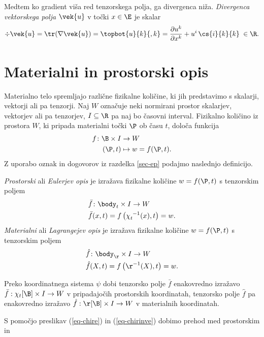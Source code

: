 Medtem ko gradient viša red tenzorskega polja, ga divergenca niža.
\emph{Divergenca vektorskega polja} $\vek{u}$ v točki $x\in\E$ je skalar
\begin{equation*}
	\div \vek{u}=\tr(\nabla\vek{u})=\topbot{u}{k}{,k}=\frac{\partial u^k}{\partial x^k}+u^i\,\cs{i}{k}{k}\;\in\R.
\end{equation*}


\section{Materialni in prostorski opis}

Materialno telo spremljajo različne fizikalne količine, ki jih predstavimo s skalarji,
vektorji ali pa tenzorji. Naj $W$ označuje neki normirani prostor
skalarjev, vektorjev ali pa tenzorjev, $I\subseteq\R$ pa naj bo časovni interval.
Fizikalno količino iz prostora $W$, ki pripada materialni točki $\P$ ob času $t$, določa funkcija
\begin{align*}
	f \colon \B\times I &\rightarrow W \\
	(\P,t) &\mapsto w = f(\P,t).
\end{align*}
Z uporabo oznak in dogovorov iz razdelka \ref{sec-ep} podajmo naslednjo definicijo.
\begin{definicija}
	\emph{Prostorski} ali \emph{Eulerjev opis} je izražava fizikalne količine $w=f(\P,t)$ s
	tenzorskim poljem
	\begin{align*}
		&\bar{f}\colon\body_t\times I \rightarrow W \\
		&\bar{f}(x,t)=f\left(\chi_t^{\phantom{t}-1}(x),t\right)=w.
	\end{align*}
	\emph{Materialni} ali \emph{Lagrangejev opis} je izražava fizikalne količine $w=f(\P,t)$ s
	tenzorskim poljem
	\begin{align*}
		&\hat{f}\colon\body_{\r}\times I \rightarrow W \\
		&\hat{f}(X,t)=f\left(\r^{-1}(X),t\right)=w.
	\end{align*}
\end{definicija}
\begin{opomba}
	Preko koordinatnega sistema $\psi$ dobi tenzorsko polje $\bar{f}$ enakovredno izražavo
	$\bar{f}:\chi_t[\B]\times I\rightarrow W$ v pripadajočih prostorskih koordinatah,
	tenzorsko polje $\hat{f}$ pa enakovredno izražavo $\hat{f}:\r[\B]\times I\rightarrow W$
	v materialnih koordinatah.
\end{opomba}
S pomočjo preslikav (\ref{eq-chire}) in (\ref{eq-chirinve}) dobimo prehod med prostorskim in

